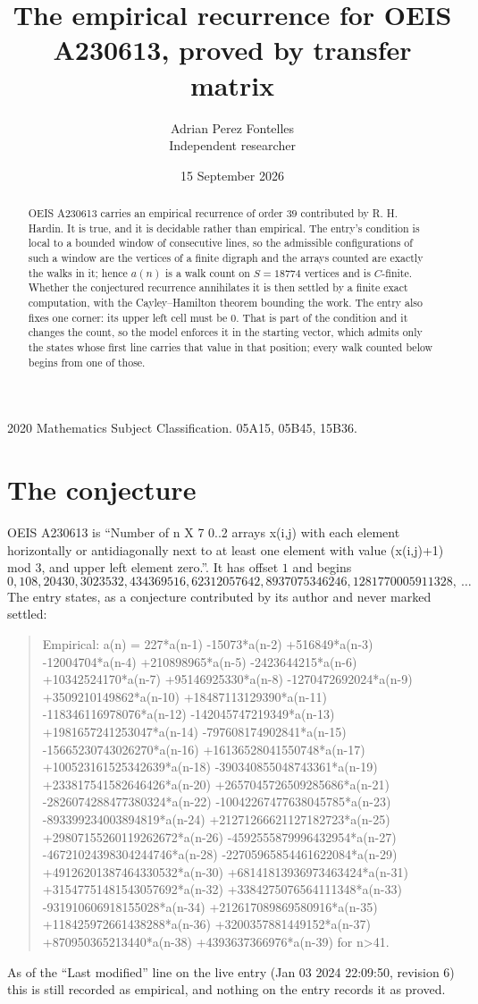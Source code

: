 \documentclass[11pt,a4paper]{article}
\title{The empirical recurrence for OEIS A230613, proved by transfer matrix}
\author{Adrian Perez Fontelles\\ \small Independent researcher}
\date{15 September 2026}
\theoremstyle{plain}
\theoremstyle{definition}
\begin{document}
\maketitle

\begin{abstract}
OEIS A230613 carries an empirical recurrence of order $39$ contributed by R. H. Hardin. It is
true, and it is decidable rather than empirical. The entry's condition is local to a bounded window of consecutive lines, so
the admissible configurations of such a window are the vertices of a finite digraph and the
arrays counted are exactly the walks in it; hence $a(n)$ is a walk count on $S=18774$ vertices
and is $C$-finite. Whether the conjectured recurrence annihilates it is then settled by a
finite exact computation, with the Cayley--Hamilton theorem bounding the work.
 The entry also fixes one corner: its upper left cell must be $0$. That is part of the condition and it changes the count, so the model enforces it in the starting vector, which admits only the states whose first line carries that value in that position; every walk counted below begins from one of those.\end{abstract}

\noindent\small 2020 Mathematics Subject Classification. 05A15, 05B45, 15B36.\normalsize

\section{The conjecture}

OEIS A230613 is ``Number of n X 7 0..2 arrays x(i,j) with each element horizontally or antidiagonally next to at least one element with value (x(i,j)+1) mod 3, and upper left element zero.''. It has offset $1$ and begins
\[
0, 108, 20430, 3023532, 434369516, 62312057642, 8937075346246, 1281770005911328,\ \dots
\]
The entry states, as a conjecture contributed by its author and never marked settled:
\begin{quote}\raggedright\small
Empirical: a(n) = 227*a(n-1) -15073*a(n-2) +516849*a(n-3) -12004704*a(n-4) +210898965*a(n-5) -2423644215*a(n-6) +10342524170*a(n-7) +95146925330*a(n-8) -1270472692024*a(n-9) +3509210149862*a(n-10) +18487113129390*a(n-11) -118346116978076*a(n-12) -142045747219349*a(n-13) +1981657241253047*a(n-14) -797608174902841*a(n-15) -15665230743026270*a(n-16) +16136528041550748*a(n-17) +100523161525342639*a(n-18) -390340855048743361*a(n-19) +233817541582646426*a(n-20) +2657045726509285686*a(n-21) -2826074288477380324*a(n-22) -10042267477638045785*a(n-23) -893399234003894819*a(n-24) +21271266621127182723*a(n-25) +29807155260119262672*a(n-26) -4592555879996432954*a(n-27) -46721024398304244746*a(n-28) -22705965854461622084*a(n-29) +49126201387464330532*a(n-30) +68141813936973463424*a(n-31) +31547751481543057692*a(n-32) +3384275076564111348*a(n-33) -931910606918155028*a(n-34) +212617089869580916*a(n-35) +118425972661438288*a(n-36) +3200357881449152*a(n-37) +870950365213440*a(n-38) +4393637366976*a(n-39) for n>41.
\end{quote}
As of the ``Last modified'' line on the live entry (Jan 03 2024 22:09:50, revision 6) this is still
recorded as empirical, and nothing on the entry records it as proved.
\end{document}

